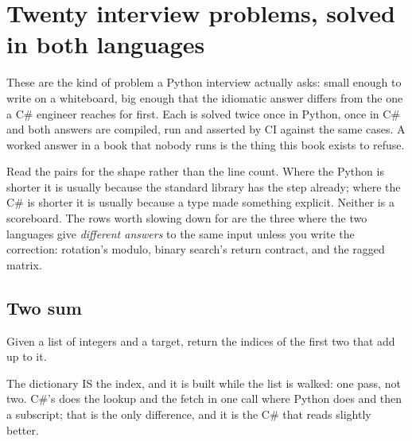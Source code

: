
\chapter{Twenty interview problems, solved in both languages}
\label{app:interview}

\noindent
These are the kind of problem a Python interview actually asks: small
enough to write on a whiteboard, big enough that the idiomatic answer
differs from the one a C\# engineer reaches for first. Each is solved twice
\dash{} once in Python, once in C\# \dash{} and both answers are compiled,
run and asserted by CI against the same cases. A worked answer in a book
that nobody runs is the thing this book exists to refuse.

Read the pairs for the shape rather than the line count. Where the Python
is shorter it is usually because the standard library has the step already;
where the C\# is shorter it is usually because a type made something
explicit. Neither is a scoreboard. The rows worth slowing down for are the
three where the two languages give \emph{different answers} to the same
input unless you write the correction: rotation's modulo, binary search's
return contract, and the ragged matrix.

\section{Two sum}
\label{sec:appD-two-sum}

\noindent
Given a list of integers and a target, return the indices of the first two that add up to it.



\noindent
The dictionary IS the index, and it is built while the list is walked: one pass, not two. C\#'s  does the lookup and the fetch in one call where Python does  and then a subscript; that is the only difference, and it is the C\# that reads slightly better.

